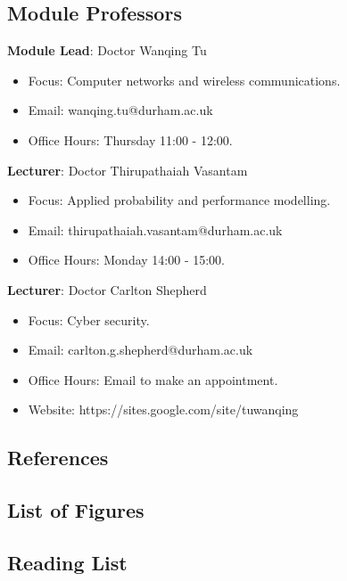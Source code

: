 \subsection{Module Professors}

\textbf{Module Lead}: Doctor Wanqing Tu

\begin{itemize}\label{modulelead-wanqingtu}
    \item Focus: Computer networks and wireless communications.
    \item Email: wanqing.tu@durham.ac.uk
    \item Office Hours: Thursday 11:00 - 12:00.
\end{itemize}

\textbf{Lecturer}: Doctor Thirupathaiah Vasantam

\begin{itemize}\label{lecturer-thirupathaiahvasantam}
    \item Focus: Applied probability and performance modelling.
    \item Email: thirupathaiah.vasantam@durham.ac.uk
    \item Office Hours: Monday 14:00 - 15:00.
\end{itemize}

\textbf{Lecturer}: Doctor Carlton Shepherd

\begin{itemize}\label{lecturer-carltonshepherd}
    \item Focus: Cyber security.
    \item Email: carlton.g.shepherd@durham.ac.uk
    \item Office Hours: Email to make an appointment.
    \item Website: https://sites.google.com/site/tuwanqing
\end{itemize}

\subsection{References}

\subsection{List of Figures}

\subsection{Reading List}

